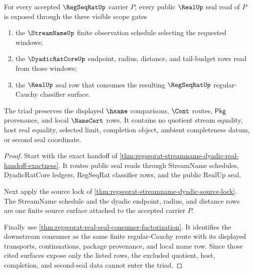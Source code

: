 \begin{theorem}
\label{thm:regseqrat-streamname-real-scope-triad}
For every accepted $\RegSeqRatUp$ carrier $P$, every public $\RealUp$ seal read
of $P$ is exposed through the three visible scope gates
\begin{enumerate}
\item the $\StreamNameUp$ finite observation schedule selecting the requested
windows;
\item the $\DyadicRatCoreUp$ endpoint, radius, distance, and tail-budget rows
read from those windows;
\item the $\RealUp$ seal row that consumes the resulting $\RegSeqRatUp$
regular-Cauchy classifier surface.
\end{enumerate}
The triad preserves the displayed $\hsame$ comparisons, $\Cont$ routes,
$\mathsf{Pkg}$ provenance, and local $\NameCert$ rows. It contains no quotient
stream equality, host real equality, selected limit, completion object,
ambient completeness datum, or second seal coordinate.
\end{theorem}
\begin{proof}
Start with the exact handoff of
\autoref{thm:regseqrat-streamname-dyadic-real-handoff-exactness}. It routes
public seal reads through StreamName schedules, DyadicRatCore ledgers,
RegSeqRat classifier rows, and the public RealUp seal.

Next apply the source lock of
\autoref{thm:regseqrat-streamname-dyadic-source-lock}. The StreamName schedule
and the dyadic endpoint, radius, and distance rows are one finite source
surface attached to the accepted carrier $P$.

Finally use \autoref{thm:regseqrat-real-seal-consumer-factorization}. It
identifies the downstream consumer as the same finite regular-Cauchy route
with its displayed transports, continuations, package provenance, and local
name row. Since those cited surfaces expose only the listed rows, the excluded
quotient, host, completion, and second-seal data cannot enter the triad.
\end{proof}


